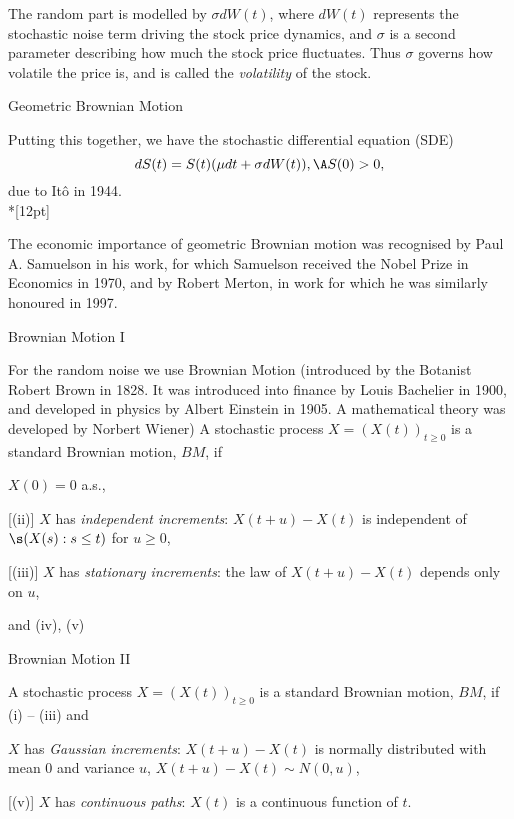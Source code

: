 The random part is modelled by $\sigma dW(t)$, where $dW(t)$
represents the stochastic noise term driving the stock price dynamics, and
$\sigma$ is a second parameter describing how much the stock price fluctuates. Thus $\sigma$
governs how volatile the price is, and is called the {\it
volatility} of the
stock.


{Geometric Brownian Motion}

Putting this together, we have the stochastic differential
equation (SDE)
\begin{equation}\label{GBM}
dS(t) = S(t) (\mu dt + \sigma dW(t)), \A S(0) > 0,
\end{equation}
due to It\^{o} in 1944.\\*[12pt]

The economic importance of geometric
Brownian motion was recognised by Paul A. Samuelson in his work, for which Samuelson received the Nobel
Prize in Economics in 1970, and by Robert Merton, in work for which he was similarly
honoured in 1997.

{Brownian Motion I}


	For the random noise we use Brownian Motion (introduced by the Botanist Robert Brown in
1828. It was introduced into finance by Louis Bachelier in 1900, and developed in physics by Albert Einstein in 1905.
A mathematical theory was developed by Norbert Wiener)
A stochastic process $X=(X(t))_{t \geq 0}$ is a standard
Brownian motion, $BM$, if

	$X(0) = 0$ a.s.,

	[(ii)] $X$ has {\it independent
increments}: $X(t+u) - X(t)$ is independent of $\s (X(s): s \leq
t)$ for $u \geq 0$,

	[(iii)]  $X$ has {\it stationary
increments}: the law of $X(t+u) - X(t)$ depends only on $u$,


and (iv), (v)

{Brownian Motion II}

A stochastic process $X=(X(t))_{t \geq 0}$ is a standard
Brownian motion, $BM$, if (i) -- (iii) and


	$X$ has {\it Gaussian increments}: $X(t+u) - X(t)$ is
normally distributed with mean $0$ and variance $u$, $X(t+u) -
X(t) \sim N(0,u)$,

	[(v)]  $X$ has {\it continuous paths}:
$X(t)$ is a continuous function of $t$.

